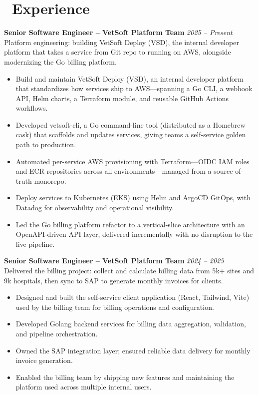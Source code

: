 \documentclass{resume}
\begin{document}
\section{\faUsers\ Experience}
\vspace{1em}
\textbf{Senior Software Engineer – VetSoft Platform Team} \hfill \textit{2025 -- Present} \\
Platform engineering: building VetSoft Deploy (VSD), the internal developer platform that takes a service from Git repo to running on AWS, alongside modernizing the Go billing platform.
\begin{itemize}
  \item Build and maintain VetSoft Deploy (VSD), an internal developer platform that standardizes how services ship to AWS—spanning a Go CLI, a webhook API, Helm charts, a Terraform module, and reusable GitHub Actions workflows.
  \item Developed vetsoft-cli, a Go command-line tool (distributed as a Homebrew cask) that scaffolds and updates services, giving teams a self-service golden path to production.
  \item Automated per-service AWS provisioning with Terraform—OIDC IAM roles and ECR repositories across all environments—managed from a source-of-truth monorepo.
  \item Deploy services to Kubernetes (EKS) using Helm and ArgoCD GitOps, with Datadog for observability and operational visibility.
  \item Led the Go billing platform refactor to a vertical-slice architecture with an OpenAPI-driven API layer, delivered incrementally with no disruption to the live pipeline.
\end{itemize}

\vspace{1em}

\textbf{Senior Software Engineer – VetSoft Platform Team} \hfill \textit{2024 -- 2025} \\
Delivered the billing project: collect and calculate billing data from 5k+ sites and 9k hospitals, then sync to SAP to generate monthly invoices for clients.
\begin{itemize}
  \item Designed and built the self-service client application (React, Tailwind, Vite) used by the billing team for billing operations and configuration.
  \item Developed Golang backend services for billing data aggregation, validation, and pipeline orchestration.
  \item Owned the SAP integration layer; ensured reliable data delivery for monthly invoice generation.
  \item Enabled the billing team by shipping new features and maintaining the platform used across multiple internal users.
\end{itemize}
\end{document}

